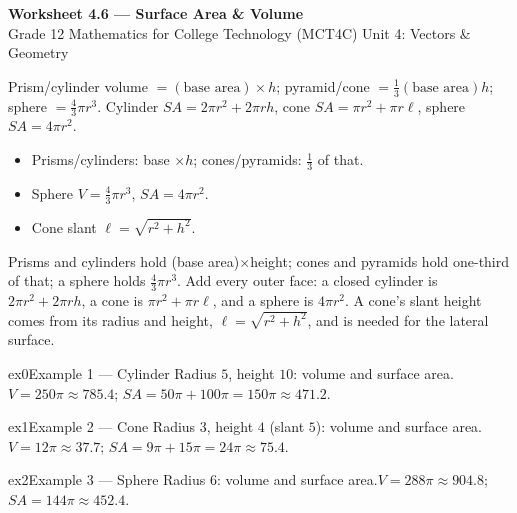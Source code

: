 \documentclass[11pt]{article}
\begin{document}
\begin{center}
{\LARGE\bfseries\color{titleblue}Worksheet 4.6 --- Surface Area \& Volume}\\[2pt]
{\small Grade 12 Mathematics for College Technology (MCT4C) \textperiodcentered{} Unit 4: Vectors \& Geometry}
\end{center}

\begin{ideabox}
Prism/cylinder volume $=(\text{base area})\times h$; pyramid/cone $=\tfrac13(\text{base area})h$; sphere $=\tfrac43\pi r^3$. Cylinder $SA=2\pi r^2+2\pi rh$, cone $SA=\pi r^2+\pi r\ell$, sphere $SA=4\pi r^2$.
\begin{itemize}[leftmargin=*,itemsep=2pt]
  \item Prisms/cylinders: base $\times h$; cones/pyramids: $\tfrac13$ of that.
  \item Sphere $V=\tfrac43\pi r^3$, $SA=4\pi r^2$.
  \item Cone slant $\ell=\sqrt{r^2+h^2}$.
\end{itemize}
\end{ideabox}

\begin{learnbox}
Prisms and cylinders hold (base area)$\times$height; cones and pyramids hold one-third of that; a sphere holds $\tfrac43\pi r^3$.
Add every outer face: a closed cylinder is $2\pi r^2+2\pi rh$, a cone is $\pi r^2+\pi r\ell$, and a sphere is $4\pi r^2$.
A cone's slant height comes from its radius and height, $\ell=\sqrt{r^2+h^2}$, and is needed for the lateral surface.
\end{learnbox}


\begin{example}{ex0}{Example 1 --- Cylinder}
Radius $5$, height $10$: volume and surface area.\soln $V=250\pi\approx785.4$; $SA=50\pi+100\pi=150\pi\approx471.2$.
\end{example}

\begin{example}{ex1}{Example 2 --- Cone}
Radius $3$, height $4$ (slant $5$): volume and surface area.\soln $V=12\pi\approx37.7$; $SA=9\pi+15\pi=24\pi\approx75.4$.
\end{example}

\begin{example}{ex2}{Example 3 --- Sphere}
Radius $6$: volume and surface area.\soln $V=288\pi\approx904.8$; $SA=144\pi\approx452.4$.
\end{example}
\end{document}
